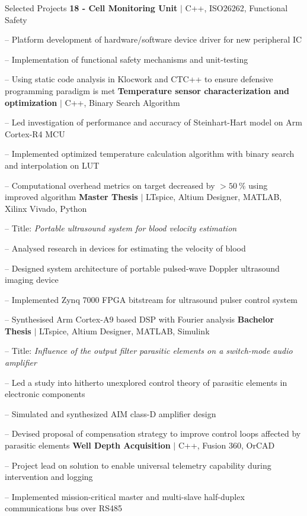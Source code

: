
\begin{rubric}{\faTasks[solid]  Selected Projects}
\entry*[2024][] \textbf{18 - Cell Monitoring Unit} $|$ C++, ISO26262, Functional Safety \par
	-- Platform development of hardware/software device driver for new peripheral IC \par
	-- Implementation of functional safety mechanisms and unit-testing \par
	-- Using static code analysis in Klocwork and CTC++ to ensure defensive programming paradigm is met
%
\entry*[2024][] \textbf{Temperature sensor characterization and optimization} $|$ C++, Binary Search Algorithm \par
	-- Led investigation of performance and accuracy of Steinhart-Hart model on Arm Cortex\textsuperscript{\textcopyright}-R4 MCU \par
	-- Implemented optimized temperature calculation algorithm with binary search and interpolation on LUT \par
	-- Computational overhead metrics on target decreased by $>\qty{50}{\percent}$ using improved algorithm
%
\entry*[2023][]%
	\textbf{Master Thesis} $|$ LTspice, Altium Designer, MATLAB, Xilinx Vivado, Python \par
	-- Title: \emph{Portable ultrasound system for blood velocity estimation} \par
	-- Analysed research in devices for estimating the velocity of blood \par
	-- Designed system architecture of portable pulsed-wave Doppler ultrasound imaging device \par
	-- Implemented Zynq 7000 FPGA bitstream for ultrasound pulser control system \par
	-- Synthesised Arm Cortex\textsuperscript{\textcopyright}-A9 based DSP with Fourier analysis
%
\entry*[2020][] \textbf{Bachelor Thesis} $|$ LTspice, Altium Designer, MATLAB, Simulink \par
	-- Title: \emph{Influence of the output filter parasitic elements on a switch-mode audio amplifier} \par
	-- Led a study into hitherto unexplored control theory of parasitic elements in electronic components \par
	-- Simulated and synthesized AIM class-D amplifier design \par
	-- Devised proposal of compensation strategy to improve control loops affected by parasitic elements
%
\entry*[2017][] \textbf{Well Depth Acquisition} $|$ C++, Fusion 360, OrCAD \par
	-- Project lead on solution to enable universal telemetry capability during intervention and logging \par
	-- Implemented mission-critical master and multi-slave half-duplex communications bus over RS485 %
%
\end{rubric}